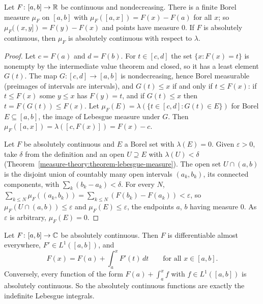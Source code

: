 \begin{lemma}\label{measure-theory:lemma-stieltjes}
Let $F \colon [a, b] \to \mathbb{R}$ be continuous and nondecreasing. There is a finite Borel measure $\mu_F$ on $[a, b]$ with $\mu_F([a, x]) = F(x) - F(a)$ for all $x$; so
$\mu_F((x, y]) = F(y) - F(x)$ and points have measure $0$. If $F$ is absolutely continuous, then $\mu_F$ is absolutely continuous with respect to $\lambda$.
\end{lemma}

\begin{proof}
Let $c = F(a)$ and $d = F(b)$. For $t \in [c, d]$ the set $\{x : F(x) = t\}$ is nonempty by the intermediate value theorem and closed, so it has a least element $G(t)$. The map
$G \colon [c, d] \to [a, b]$ is nondecreasing, hence Borel measurable (preimages of intervals are intervals), and $G(t) \leq x$ if and only if $t \leq F(x)$: if $t \leq F(x)$ some
$y \leq x$ has $F(y) = t$, and if $G(t) \leq x$ then $t = F(G(t)) \leq F(x)$. Let $\mu_F(E) = \lambda(\{t \in [c, d] : G(t) \in E\})$ for Borel $E \subseteq [a, b]$, the image of
Lebesgue measure under $G$. Then $\mu_F([a, x]) = \lambda([c, F(x)]) = F(x) - c$.

Let $F$ be absolutely continuous and $E$ a Borel set with $\lambda(E) = 0$. Given $\varepsilon > 0$, take $\delta$ from the definition and an open $U \supseteq E$ with $\lambda(U) < \delta$
(Theorem~\ref{measure-theory:theorem-lebesgue-measure}). The open set $U \cap (a, b)$ is the disjoint union of countably many open intervals $(a_k, b_k)$, its connected components,
with $\sum_k(b_k - a_k) < \delta$. For every $N$, $\sum_{k \leq N}\mu_F((a_k, b_k)) = \sum_{k \leq N}(F(b_k) - F(a_k)) < \varepsilon$, so $\mu_F(U \cap (a, b)) \leq \varepsilon$ and
$\mu_F(E) \leq \varepsilon$, the endpoints $a$, $b$ having measure $0$. As $\varepsilon$ is arbitrary, $\mu_F(E) = 0$.
\end{proof}

\begin{theorem}\label{measure-theory:theorem-absolutely-continuous}
Let $F \colon [a, b] \to \mathbb{C}$ be absolutely continuous. Then $F$ is differentiable almost everywhere, $F' \in L^1([a, b])$, and
\[
F(x) = F(a) + \int_a^xF'(t)\,dt \qquad \text{for all } x \in [a, b].
\]
Conversely, every function of the form $F(a) + \int_a^xf$ with $f \in L^1([a, b])$ is absolutely continuous. So the absolutely continuous functions are exactly the indefinite
Lebesgue integrals.
\end{theorem}

